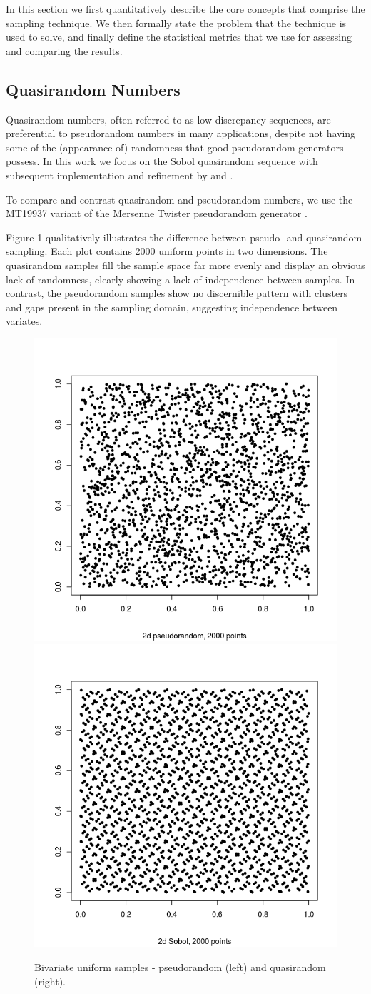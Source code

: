 \documentclass{JASSS}
\begin{document}
In this section we first quantitatively describe the core concepts that comprise the sampling technique. We then formally state the problem that the technique is used to solve, and finally define the statistical metrics that we use for assessing and comparing the results.  

\subsection{Quasirandom Numbers}\label{quasirandom-numbers}
Quasirandom numbers, often referred to as low discrepancy sequences, are
preferential to pseudorandom numbers in many applications, despite not
having some of the (appearance of) randomness that good pseudorandom
generators possess. In this work we focus on the Sobol quasirandom
sequence \citep{sobol_1967} with subsequent implementation and refinement by \cite{bratley_algorithm_1988} and \cite{joe_remark_2003}.

To compare and contrast quasirandom and pseudorandom numbers, we use the MT19937 variant of the Mersenne Twister pseudorandom generator \citep{matsumoto_mersenne_1998}.

Figure 1 qualitatively illustrates the difference between pseudo- and
quasirandom sampling. Each plot contains 2000 uniform points in two
dimensions. The quasirandom samples fill the sample space far more
evenly and display an obvious lack of randomness, clearly showing a lack
of independence between samples. In contrast, the pseudorandom samples
show no discernible pattern with clusters and gaps present in the
sampling domain, suggesting independence between variates.

\begin{figure}[!t]
\includegraphics[width=0.5\linewidth]{figures/pseudo2d} 
\includegraphics[width=0.5\linewidth]{figures/quasi2d} 
\caption{Bivariate uniform samples -  pseudorandom (left) and quasirandom (right).}
\label{fig:unnamed-chunk-1}
\end{figure}
\end{document}
